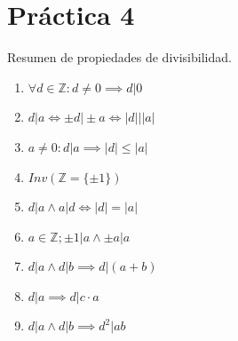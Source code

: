 
\usepackage{caratula}
\usepackage{enumerate}
\usepackage{hyperref}
\usepackage{graphicx}
\usepackage{amsfonts}
\usepackage{enumitem}
\usepackage{amsmath}

\decimalpoint
\hypersetup{colorlinks=true, linkcolor=black, urlcolor=blue}
\setlength{\parindent}{0em}
\setlength{\parskip}{0.5em}
\setcounter{tocdepth}{2} %
\setcounter{section}{3} %
\renewcommand{\thesubsubsection}{\thesubsection.\Alph{subsubsection}}
\graphicspath{ {images/} }





\maketitle
\newpage

\tableofcontents
\newpage

\section{Práctica 4}

Resumen de propiedades de divisibilidad.
\begin{enumerate}
    \item $ \forall d \in \mathbb{Z}: d \neq 0 \implies d|0 $
    \item $ d|a \iff \pm d \vert \pm a \iff |d| \vert |a| $
    \item $ a \neq 0: d|a \implies |d| \leq |a| $
    \item $ Inv(\mathbb{Z} = \{ \pm 1 \}) $
    \item $ d|a \wedge a|d \iff |d| = |a| $
    \item $ a \in \mathbb{Z}; \pm 1 |a \wedge \pm a |a $
    \item $ d|a \wedge d|b \implies d|(a+b) $
    \item $ d|a \implies d|c\cdot a $
    \item $ d|a \wedge d|b \implies d^2 | ab $
\end{enumerate}


